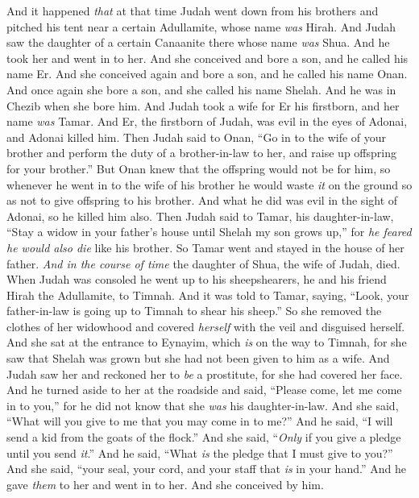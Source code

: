 \begin{biblechapter} %
 And it happened \textit{that} at that time Judah went down from his brothers and pitched his tent near a certain Adullamite, whose name \textit{was} Hirah.
\verse And Judah saw the daughter of a certain Canaanite there whose name \textit{was} Shua. And he took her and went in to her.
\verse And she conceived and bore a son, and he called his name Er.
\verse And she conceived again and bore a son, and he called his name Onan.
\verse And once again she bore a son, and she called his name Shelah. And he was in Chezib when she bore him.
\verse And Judah took a wife for Er his firstborn, and her name \textit{was} Tamar.
\verse And Er, the firstborn of Judah, was evil in the eyes of Adonai, and Adonai killed him.
\verse Then Judah said to Onan, “Go in to the wife of your brother and perform the duty of a brother-in-law to her, and raise up offspring for your brother.”
\verse But Onan knew that the offspring would not be for him, so whenever he went in to the wife of his brother he would waste \textit{it} on the ground so as not to give offspring to his brother.
\verse And what he did was evil in the sight of Adonai, so he killed him also.
\verse Then Judah said to Tamar, his daughter-in-law, “Stay a widow in your father’s house until Shelah my son grows up,” for \textit{he feared he would also die} like his brother. So Tamar went and stayed in the house of her father.
\verse \textit{And in the course of time} the daughter of Shua, the wife of Judah, died. When Judah was consoled he went up to his sheepshearers, he and his friend Hirah the Adullamite, to Timnah.
\verse And it was told to Tamar, saying, “Look, your father-in-law is going up to Timnah to shear his sheep.”
\verse So she removed the clothes of her widowhood and covered \textit{herself} with the veil and disguised herself. And she sat at the entrance to Eynayim, which \textit{is} on the way to Timnah, for she saw that Shelah was grown but she had not been given to him as a wife.
\verse And Judah saw her and reckoned her to \textit{be} a prostitute, for she had covered her face.
\verse And he turned aside to her at the roadside and said, “Please come, let me come in to you,” for he did not know that she \textit{was} his daughter-in-law. And she said, “What will you give to me that you may come in to me?”
\verse And he said, “I will send a kid from the goats of the flock.” And she said, “\textit{Only} if you give a pledge until you send \textit{it}.”
\verse And he said, “What \textit{is} the pledge that I must give to you?” And she said, “your seal, your cord, and your staff that \textit{is} in your hand.” And he gave \textit{them} to her and went in to her. And she conceived by him.

\end{biblechapter}
